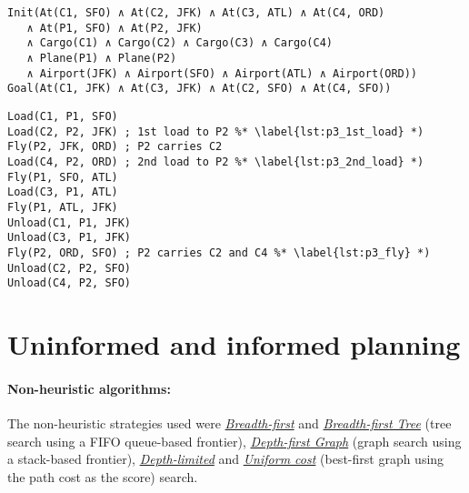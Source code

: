 \documentclass[12pt, a4paper, oneside]{article}
\begin{document}
\begin{lstlisting}[caption=Problem 3 initial state and goal,label=lst:problem3]
Init(At(C1, SFO) ∧ At(C2, JFK) ∧ At(C3, ATL) ∧ At(C4, ORD) 
   ∧ At(P1, SFO) ∧ At(P2, JFK) 
   ∧ Cargo(C1) ∧ Cargo(C2) ∧ Cargo(C3) ∧ Cargo(C4)
   ∧ Plane(P1) ∧ Plane(P2)
   ∧ Airport(JFK) ∧ Airport(SFO) ∧ Airport(ATL) ∧ Airport(ORD))
Goal(At(C1, JFK) ∧ At(C3, JFK) ∧ At(C2, SFO) ∧ At(C4, SFO))
\end{lstlisting}

\begin{lstlisting}[caption=Problem 3 optimal plan,label=lst:problem3_plan]
Load(C1, P1, SFO)
Load(C2, P2, JFK) ; 1st load to P2 %* \label{lst:p3_1st_load} *)
Fly(P2, JFK, ORD) ; P2 carries C2
Load(C4, P2, ORD) ; 2nd load to P2 %* \label{lst:p3_2nd_load} *)
Fly(P1, SFO, ATL)
Load(C3, P1, ATL)
Fly(P1, ATL, JFK)
Unload(C1, P1, JFK)
Unload(C3, P1, JFK)
Fly(P2, ORD, SFO) ; P2 carries C2 and C4 %* \label{lst:p3_fly} *)
Unload(C2, P2, SFO)
Unload(C4, P2, SFO)
\end{lstlisting}

\section{Uninformed and informed planning}

\paragraph{Non-heuristic algorithms:} The non-heuristic strategies used
were \href{https://github.com/sunsided/aima-pseudocode/blob/master/md/Breadth-First-Search.md}{\textit{Breadth-first}} and \href{https://github.com/sunsided/aima-pseudocode/blob/master/md/Tree-Search-and-Graph-Search.md}{\textit{Breadth-first Tree}} (tree search using a FIFO queue-based frontier),
\href{https://github.com/sunsided/aima-pseudocode/blob/master/md/Tree-Search-and-Graph-Search.md}{\textit{Depth-first Graph}} (graph search using a stack-based frontier), \href{https://github.com/sunsided/aima-pseudocode/blob/master/md/Depth-Limited-Search.md}{\textit{Depth-limited}} and \href{https://github.com/sunsided/aima-pseudocode/blob/master/md/Uniform-Cost-Search.md}{\textit{Uniform cost}} (best-first graph using the path cost as the score) search.
\end{document}
